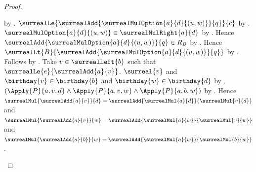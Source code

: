 \begin{proof}
\begin{subproof}
\begin{subproof}
\begin{byCase}
\begin{byCase}
                                by .
                            $\surrealLe
                                {\surrealAdd
                                    {\surrealMulOption{a}{d}{(u,w)}}{q}}
                                {c}$
                                by
                                .
                            $\surrealMulOption{a}{d}{(u,w)}
                                \in\surrealMulRight{a}{d}$
                                by .
                            Hence $\surrealAdd
                                {\surrealMulOption{a}{d}{(u,w)}}{q}
                                \in R_B$
                                by .
                            Hence $\surrealLt{B}
                                {\surrealAdd
                                    {\surrealMulOption{a}{d}{(u,w)}}{q}}$
                                by .
                            Follows by
                                .
                            Take $v\in\surrealLeft{b}$ such that
                                $\surrealLe{e}{\surrealAdd{a}{v}}$.
                            $\surreal{v}$ and
                                $\birthday{v}\in\birthday{b}$ and
                                $\birthday{w}\in\birthday{d}$
                                by
                                .
                            $(\Apply{P}{a,v,d}
                              \land\Apply{P}{a,v,w}
                              \land\Apply{P}{a,b,w})$
                                by \auto.
                            Hence
                                $\surrealMul{\surrealAdd{a}{v}}{d}
                                    =\surrealAdd{\surrealMul{a}{d}}
                                        {\surrealMul{v}{d}}$ and
                                $\surrealMul{\surrealAdd{a}{v}}{w}
                                    =\surrealAdd{\surrealMul{a}{w}}
                                        {\surrealMul{v}{w}}$ and
                                $\surrealMul{\surrealAdd{a}{b}}{w}
                                    =\surrealAdd{\surrealMul{a}{w}}
                                        {\surrealMul{b}{w}}$.

\end{byCase}
\end{byCase}
\end{subproof}
\end{subproof}
\end{proof}
